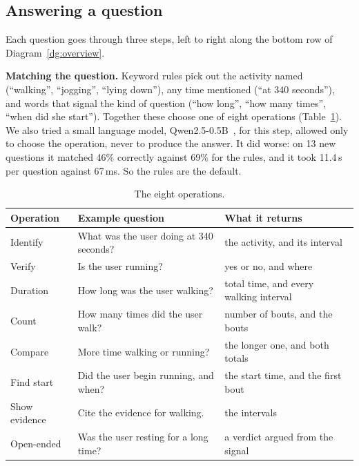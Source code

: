 \documentclass[11pt,a4paper]{article}
\begin{document}
\subsection{Answering a question}
Each question goes through three steps, left to right along the bottom row of Diagram~\ref{dg:overview}.

\textbf{Matching the question.} Keyword rules pick out the activity named (``walking'', ``jogging'', ``lying down''), any time mentioned (``at 340 seconds''), and words that signal the kind of question (``how long'', ``how many times'', ``when did she start''). Together these choose one of eight operations (Table~\ref{tab:ops}). We also tried a small language model, Qwen2.5-0.5B~\cite{qwen}, for this step, allowed only to choose the operation, never to produce the answer. It did worse: on 13 new questions it matched 46\% correctly against 69\% for the rules, and it took 11.4\,s per question against 67\,ms. So the rules are the default.

\begin{table}[h]
\centering\small
\begin{tabular}{@{}lll@{}}
\toprule
Operation & Example question & What it returns \\
\midrule
Identify & What was the user doing at 340 seconds? & the activity, and its interval \\
Verify & Is the user running? & yes or no, and where \\
Duration & How long was the user walking? & total time, and every walking interval \\
Count & How many times did the user walk? & number of bouts, and the bouts \\
Compare & More time walking or running? & the longer one, and both totals \\
Find start & Did the user begin running, and when? & the start time, and the first bout \\
Show evidence & Cite the evidence for walking. & the intervals \\
Open-ended & Was the user resting for a long time? & a verdict argued from the signal \\
\bottomrule
\end{tabular}
\caption{The eight operations.}
\label{tab:ops}
\end{table}
\end{document}
